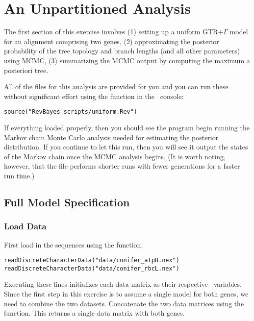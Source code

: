 \bigskip
\section{An Unpartitioned Analysis}\label{secUnif} 

The first section of this exercise involves 
(1) setting up a uniform GTR+$\Gamma$ model for an alignment comprising two genes, 
(2) approximating the posterior probability of the tree topology and branch lengths (and all other parameters) using MCMC,  
(3) summarizing the MCMC output by computing the maximum a posteriori tree. 

All of the files for this analysis are provided for you and you can run these without significant effort using the  function in the \RevBayes~console:
{\tt \begin{snugshade*}
\begin{lstlisting}
source("RevBayes_scripts/uniform.Rev")
\end{lstlisting}
\end{snugshade*}}

If everything loaded properly, then you should see the program begin running the Markov chain Monte Carlo analysis needed for estimating the posterior distribution. If you continue to let this run, then you will see it output the states of the Markov chain once the MCMC analysis begins. (It is worth noting, however, that the file  performs shorter runs with fewer generations for a faster run time.)

\bigskip
\subsection{Full Model Specification}

\subsubsection{Load Data}

First load in the sequences using the  function. 
{\tt \begin{snugshade*}
\begin{lstlisting}
readDiscreteCharacterData("data/conifer_atpB.nex")
readDiscreteCharacterData("data/conifer_rbcL.nex")
\end{lstlisting}
\end{snugshade*}}
Executing these lines initializes each data matrix as their respective \Rev~variables. 
Since the first step in this exercise is to assume a single model for both genes, we need to combine the two datasets.
Concatenate the two data matrices using the  function. This returns a single data matrix with both genes.

